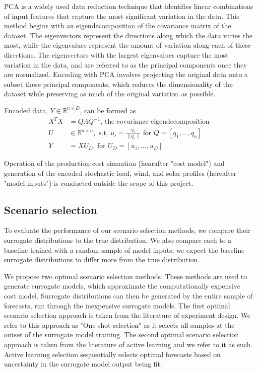 \documentclass[10pt,twocolumn,letterpaper]{article}
\begin{document}
PCA is a widely used data reduction technique that identifies linear combinations of input features that capture the most significant variation in the data. This method begins with an eigendecomposition of the covariance matrix of the dataset. The eigenvectors represent the directions along which the data varies the most, while the eigenvalues represent the amount of variation along each of these directions. The eigenvectors with the largest eigenvalues capture the most variation in the data, and are referred to as the principal components once they are normalized. Encoding with PCA involves projecting the original data onto a subset these principal components, which reduces the dimensionality of the dataset while preserving as much of the original variation as possible.

Encoded data, $Y \in \mathbb{R}^{n\times D}$, can be formed as 
\begin{align*}
    X^TX &= Q\Lambda Q^{-1} \textrm{, the covariance eigendecomposition}\\
    U &\in \mathbb{R}^{n\times n}, \textrm{ s.t. } u_i = \frac{q_i}{\lVert q_i \rVert} \textrm{ for } Q = [q_1, \dots, q_n]\\
    Y &= XU_D \textrm{, for } U_D = [u_1, \dots, u_D]
\end{align*}

Operation of the production cost simuation (hearafter "cost model") and generation of the encoded stochastic load, wind, and solar profiles (hereafter "model inputs") is conducted outside the scope of this project. 

\subsection{Scenario selection}
To evaluate the performance of our scenario selection methods, we compare their surrogate distributions to the true distribution. We also compare each to a baseline trained with a random sample of model inputs; we expect the baseline surrogate distributions to differ more from the true distribution.

We propose two optimal scenario selection methods. These methods are used to generate surrogate models, which approximate the computationally expensive cost model. Surrogate distributions can then be generated by the entire sample of forecasts, run through the inexpensive surrogate models. The first optimal scenario selection approach is taken from the literature of experiment design. We refer to this approach as "One-shot selection" as it selects all samples at the outset of the surrogate model training. The second optimal scenario selection approach is taken from the literature of active learning and we refer to it as such. Active learning selection sequentially selects optimal forecasts based on uncertainty in the surrogate model output being fit.
\end{document}
